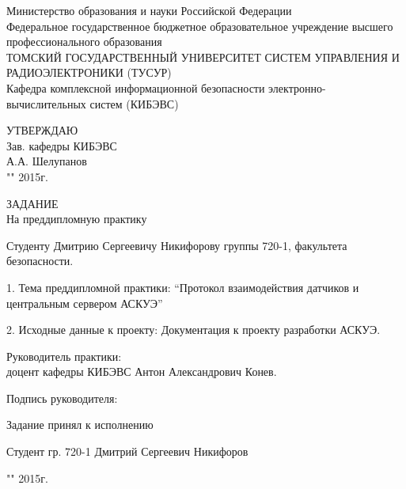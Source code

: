 \newpage
{}

\begin{center}
Министерство образования и науки Российской Федерации\\
Федеральное государственное бюджетное образовательное учреждение высшего профессионального образования\\
ТОМСКИЙ ГОСУДАРСТВЕННЫЙ УНИВЕРСИТЕТ СИСТЕМ УПРАВЛЕНИЯ И РАДИОЭЛЕКТРОНИКИ (ТУСУР)\\
Кафедра комплексной информационной безопасности электронно-вычислительных систем (КИБЭВС)\\
\end{center}

\begin{flushright}
 \begin{minipage}{0.4\textwidth}
  УТВЕРЖДАЮ \\
  Зав. кафедры КИБЭВС \\
  \underline{\hspace{2.5cm}}А.А. Шелупанов \\
  "\underline{\hspace{1cm}}"\underline{\hspace{3cm}} 2015г.
 \end{minipage}
\end{flushright}

\vspace{2cm}

\begin{center}
 ЗАДАНИЕ \\
 На преддипломную практику
\end{center}

Студенту Дмитрию Сергеевичу Никифорову группы 720-1, факультета безопасности.

1. Тема преддипломной практики: ``Протокол взаимодействия датчиков и центральным сервером АСКУЭ''

2. Исходные данные к проекту: Документация к проекту разработки АСКУЭ.

Руководитель практики: \\ доцент кафедры КИБЭВС Антон Александрович Конев.

\hfill Подпись руководителя: \underline{\hspace{2.5cm}}

Задание принял к исполнению

Студент гр. 720-1 Дмитрий Сергеевич Никифоров \hfill \underline{\hspace{2.5cm}}

\hfill "\underline{\hspace{1cm}}"\underline{\hspace{3cm}} 2015г.